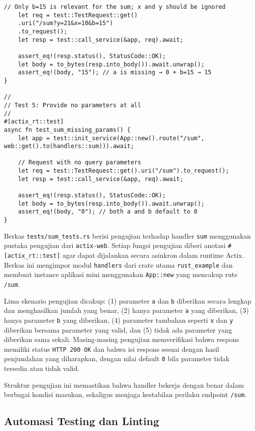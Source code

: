 \begin{lstlisting}[style=RustStyle, caption={tests/sum\_tests.rs}]
	// Only b=15 is relevant for the sum; x and y should be ignored
	let req = test::TestRequest::get()
	.uri("/sum?y=21&x=10&b=15")
	.to_request();
	let resp = test::call_service(&app, req).await;
	
	assert_eq!(resp.status(), StatusCode::OK);
	let body = to_bytes(resp.into_body()).await.unwrap();
	assert_eq!(body, "15"); // a is missing → 0 + b=15 → 15
}

//
// Test 5: Provide no parameters at all
//
#[actix_rt::test]
async fn test_sum_missing_params() {
	let app = test::init_service(App::new().route("/sum", web::get().to(handlers::sum))).await;
	
	// Request with no query parameters
	let req = test::TestRequest::get().uri("/sum").to_request();
	let resp = test::call_service(&app, req).await;
	
	assert_eq!(resp.status(), StatusCode::OK);
	let body = to_bytes(resp.into_body()).await.unwrap();
	assert_eq!(body, "0"); // both a and b default to 0
}

\end{lstlisting}

Berkas \texttt{tests/sum\_tests.rs} berisi pengujian terhadap handler \texttt{sum} menggunakan pustaka pengujian dari \texttt{actix-web}. Setiap fungsi pengujian diberi anotasi \texttt{\#[actix\_rt::test]} agar dapat dijalankan secara asinkron dalam runtime Actix. Berkas ini mengimpor modul \texttt{handlers} dari crate utama \texttt{rust\_example} dan membuat instance aplikasi mini menggunakan \texttt{App::new} yang mencakup rute \texttt{/sum}.

Lima skenario pengujian dicakup: (1) parameter \texttt{a} dan \texttt{b} diberikan secara lengkap dan menghasilkan jumlah yang benar, (2) hanya parameter \texttt{a} yang diberikan, (3) hanya parameter \texttt{b} yang diberikan, (4) parameter tambahan seperti \texttt{x} dan \texttt{y} diberikan bersama parameter yang valid, dan (5) tidak ada parameter yang diberikan sama sekali. Masing-masing pengujian memverifikasi bahwa respons memiliki status \texttt{HTTP 200 OK} dan bahwa isi respons sesuai dengan hasil penjumlahan yang diharapkan, dengan nilai default \texttt{0} bila parameter tidak tersedia atau tidak valid.

Struktur pengujian ini memastikan bahwa handler bekerja dengan benar dalam berbagai kondisi masukan, sekaligus menjaga kestabilan perilaku endpoint \texttt{/sum}.

\subsection{Automasi Testing dan Linting}

